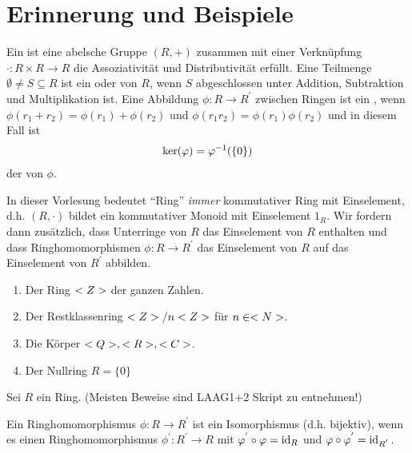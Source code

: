 \section{Erinnerung und Beispiele}

\begin{erinnerung}
	Ein  ist eine abelsche Gruppe $(R,+)$ zusammen mit einer Verknüpfung $\cdot : R\times R \to R$ die Assoziativität und Distributivität erfüllt. Eine Teilmenge $\emptyset \neq S \subseteq R$ ist ein  oder  von $R$, wenn $S$ abgeschlossen unter Addition, Subtraktion und Multiplikation ist. Eine Abbildung $\phi : R \to R^{'}$ zwischen Ringen ist ein , wenn $\phi(r_1 + r_2) = \phi(r_1) + \phi(r_2) \text{ und } \phi(r_1 r_2) = \phi(r_1) \phi(r_2)$ und in diesem Fall ist
	\begin{align}
		\ker(\phi)=\phi^{-1}(\{0\}) \notag
	\end{align}
	der  von $\phi$.
\end{erinnerung}

\begin{remark}
	In dieser Vorlesung bedeutet ``Ring'' \emph{immer} kommutativer Ring mit Einselement, d.h. $(R,\cdot)$ bildet ein kommutativer Monoid mit Einselement $1_R$. Wir fordern dann zusätzlich, dass Unterringe von $R$ das Einselement von $R$ enthalten und dass Ringhomomorphismen $\phi : R \to R^{'}$ das Einselement von $R$ auf das Einselement von $R^{'}$ abbilden.
\end{remark}

\begin{example}
	\begin{enumerate}
		\item Der Ring $\whole$ der ganzen Zahlen.
		\item Der Restklassenring $\whole / n \whole$ für $n \in \natur$.
		\item Die Körper $\ratio, \real, \comp$.
		\item Der Nullring $R = \{0\}$
	\end{enumerate}
\end{example}

Sei $R$ ein Ring. (Meisten Beweise sind LAAG1+2 Skript zu entnehmen!)

\begin{proposition}
	Ein Ringhomomorphismus $\phi: R \to R^{'}$ ist ein Isomorphismus (d.h. bijektiv), wenn es einen Ringhomomorphismus $\phi^{'}: R^{'} \to R$ mit $\phi^{'} \circ \phi = \id_R$ und $\phi \circ \phi^{'} = \id_{R^{'}}$.
\end{proposition}

